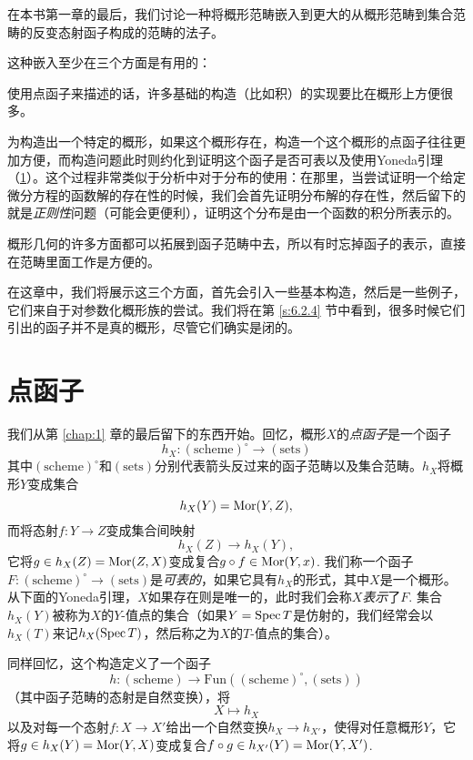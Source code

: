 在本书第一章的最后，我们讨论一种将概形范畴嵌入到更大的从概形范畴到集合范畴的反变态射函子构成的范畴的法子。

这种嵌入至少在三个方面是有用的：

\begin{compactenum}[(1)]
\item 使用点函子来描述的话，许多基础的构造（比如积）的实现要比在概形上方便很多。
\item 为构造出一个特定的概形，如果这个概形存在，构造一个这个概形的点函子往往更加方便，而构造问题此时则约化到证明这个函子是否可表以及使用Yoneda引理（\ref{s:6.1}）。这个过程非常类似于分析中对于分布的使用：在那里，当尝试证明一个给定微分方程的函数解的存在性的时候，我们会首先证明分布解的存在性，然后留下的就是\textit{正则性}问题（可能会更便利），证明这个分布是由一个函数的积分所表示的。
\item 概形几何的许多方面都可以拓展到函子范畴中去，所以有时忘掉函子的表示，直接在范畴里面工作是方便的。
\end{compactenum}

在这章中，我们将展示这三个方面，首先会引入一些基本构造，然后是一些例子，它们来自于对参数化概形族的尝试。我们将在第 \ref{s:6.2.4} 节中看到，很多时候它们引出的函子并不是真的概形，尽管它们确实是闭的。

\section{点函子}\label{s:6.1}

我们从第 \ref{chap:1} 章的最后留下的东西开始。回忆，概形$X$的\textit{点函子}是一个函子
\[
	h_X:(\text{scheme})^\circ \to (\text{sets})
\]
其中$(\text{scheme})^\circ$和$(\text{sets})$分别代表箭头反过来的函子范畴以及集合范畴。$h_X$将概形$Y$变成集合
\[
	h_X(Y)=\operatorname{Mor}(Y,Z),
\]
而将态射$f:Y\to Z$变成集合间映射
\[
	h_X(Z)\to h_X(Y),
\]
它将$g\in h_X(Z)=\operatorname{Mor}(Z,X)$变成复合$g\circ f\in \operatorname{Mor}(Y,x)$. 我们称一个函子$F:(\text{scheme})^\circ \to (\text{sets})$是\textit{可表的}，如果它具有$h_X$的形式，其中$X$是一个概形。从下面的Yoneda引理，$X$如果存在则是唯一的，此时我们会称$X$\textit{表示}了$F$. 集合$h_X(Y)$被称为$X$的$Y$-值点的集合（如果$Y=\operatorname{Spec} T$是仿射的，我们经常会以$h_X(T)$来记$h_X(\operatorname{Spec} T)$，然后称之为$X$的$T$-值点的集合）。

同样回忆，这个构造定义了一个函子
\[
	h:(\text{scheme})\to \mathrm{Fun}((\text{scheme})^\circ ,(\text{sets}))
\]
（其中函子范畴的态射是自然变换），将
\[
	X\mapsto h_X
\]
以及对每一个态射$f:X\to X'$给出一个自然变换$h_X\to h_{X'}$，使得对任意概形$Y$，它将$g\in h_X(Y)=\operatorname{Mor}(Y,X)$变成复合$f\circ g\in h_{X'}(Y)=\operatorname{Mor}(Y,X')$.

